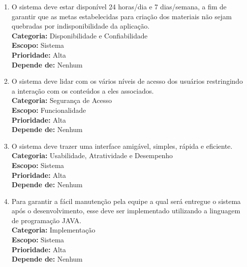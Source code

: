 \begin{enumerate}[label=\textbf{RNF\protect\twodigits{\theenumi}}, leftmargin=2cm]

	\item \label{rf:papeis} O sistema deve estar disponível 24 horas/dia e 7 dias/semana, a fim de garantir que as metas estabelecidas para criação dos materiais não sejam quebradas por indisponibilidade da aplicação. \\
		\textbf{Categoria:} Disponibilidade e Confiabilidade \\
		\textbf{Escopo:} Sistema \\
		\textbf{Prioridade:} Alta \\
		\textbf{Depende de:} Nenhum

	\item \label{rf:papeis} O sistema deve lidar com os vários níveis de acesso dos usuários restringindo a interação com os conteúdos a eles associados. \\
		\textbf{Categoria:} Segurança de Acesso \\
		\textbf{Escopo:} Funcionalidade \\
		\textbf{Prioridade:} Alta \\
		\textbf{Depende de:} Nenhum

	\item \label{rf:papeis} O sistema deve trazer uma interface amigável, simples, rápida e eficiente. \\
		\textbf{Categoria:} Usabilidade, Atratividade e Desempenho \\
		\textbf{Escopo:} Sistema \\
		\textbf{Prioridade:} Alta \\
		\textbf{Depende de:} Nenhum

	\item \label{rf:papeis} Para garantir a fácil manutenção pela equipe a qual será entregue o sistema após o desenvolvimento, esse deve ser implementado utilizando a linguagem de programação JAVA. \\
		\textbf{Categoria:} Implementação \\
		\textbf{Escopo:} Sistema \\
		\textbf{Prioridade:} Alta \\
		\textbf{Depende de:} Nenhum

\end{enumerate}

